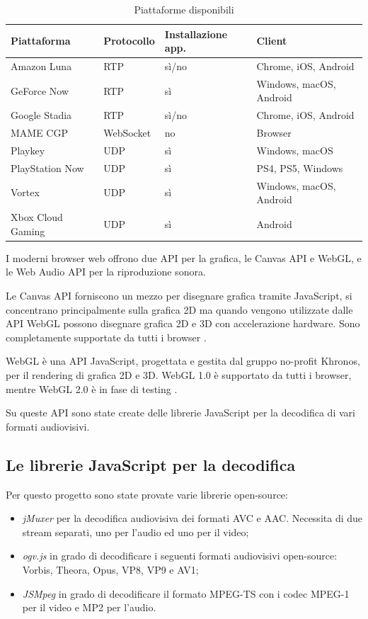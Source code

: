 \begin{table}[H]
	\centering
	\begin{tabular}{||l l l l||} 
		\hline
		Piattaforma & Protocollo & Installazione app. & Client \\
		\hline\hline
		Amazon Luna & RTP & sì/no & Chrome, iOS, Android \\
		\hline
		GeForce Now & RTP & sì & Windows, macOS, Android \\
		\hline
		Google Stadia & RTP & sì/no & Chrome, iOS, Android \\
		\hline
		MAME CGP & WebSocket & no & Browser \\
		\hline
		Playkey & UDP & sì & Windows, macOS \\
		\hline
		PlayStation Now & UDP & sì & PS4, PS5, Windows \\
		\hline
		Vortex & UDP & sì & Windows, macOS, Android \\
		\hline		
		Xbox Cloud Gaming & UDP & sì & Android \\
		\hline
	\end{tabular}

	\caption{Piattaforme disponibili}
	\label{table:ClientPerCloudGaming}
\end{table}

I moderni browser web offrono due API per la grafica, le Canvas API e WebGL, e le Web Audio API per la riproduzione sonora.

Le Canvas API forniscono un mezzo per disegnare grafica tramite JavaScript, si concentrano principalmente sulla grafica 2D ma quando vengono utilizzate dalle API WebGL possono disegnare grafica 2D e 3D con accelerazione hardware. Sono completamente supportate da tutti i browser \parencite{Canvas_API}.

WebGL è una API JavaScript, progettata e gestita dal gruppo no-profit Khronos, per il rendering di grafica 2D e 3D. WebGL 1.0 è supportato da tutti i browser, mentre WebGL 2.0 è in fase di testing \parencite{WebGL}.

Su queste API sono state create delle librerie JavaScript per la decodifica di vari formati audiovisivi.

\subsection{Le librerie JavaScript per la decodifica}
Per questo progetto sono state provate varie librerie open-source:

\begin{itemize}
	\item \textit{jMuxer} per la decodifica audiovisiva dei formati AVC e AAC. Necessita di due stream separati, uno per l'audio ed uno per il video;	
	\item \textit{ogv.js} in grado di decodificare i seguenti formati audiovisivi open-source: Vorbis, Theora, Opus, VP8, VP9 e AV1;
	\item \textit{JSMpeg} in grado di decodificare il formato MPEG-TS con i codec MPEG-1 per il video e MP2 per l'audio.
\end{itemize}

